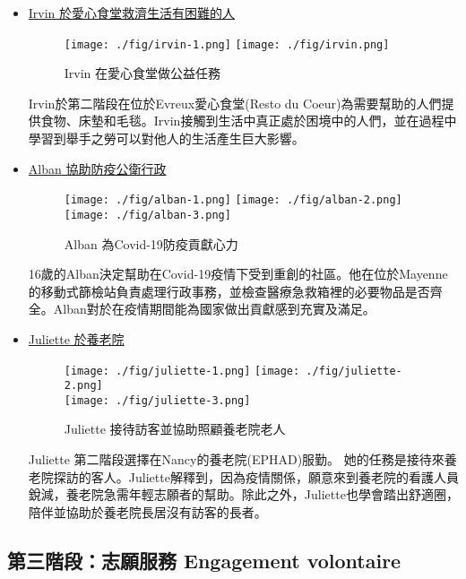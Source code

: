 \documentclass[a4paper,14pt]{extarticle}
\theoremstyle{plain}
\theoremstyle{remark}
\numberwithin{equation}{section}
\begin{document}
\begin{itemize}
  \item \href{https://www.youtube.com/watch?v=ABboKKTpFp4}{Irvin 於愛心食堂救濟生活有困難的人}
\begin{figure}[H]
    \centering
    \texttt{[image: ./fig/irvin-1.png]}
    \texttt{[image: ./fig/irvin.png]}
    \caption{Irvin 在愛心食堂做公益任務}
\end{figure}
Irvin於第二階段在位於Evreux愛心食堂(Resto du Coeur)為需要幫助的人們提供食物、床墊和毛毯。Irvin接觸到生活中真正處於困境中的人們，並在過程中學習到舉手之勞可以對他人的生活產生巨大影響。
\item \href{https://www.youtube.com/watch?v=3mOpBhQCeV4}{Alban 協助防疫公衛行政}
\begin{figure}[H]
    \centering
    \texttt{[image: ./fig/alban-1.png]}
    \texttt{[image: ./fig/alban-2.png]}
    \texttt{[image: ./fig/alban-3.png]}
    \caption{Alban 為Covid-19防疫貢獻心力}
    \label{fig:alban_snu}
\end{figure}
    16歲的Alban決定幫助在Covid-19疫情下受到重創的社區。他在位於Mayenne的移動式篩檢站負責處理行政事務，並檢查醫療急救箱裡的必要物品是否齊全。Alban對於在疫情期間能為國家做出貢獻感到充實及滿足。
  \item \href{https://www.youtube.com/watch?v=GJaVtazMRgI}{Juliette 於養老院}

\begin{figure}[H]
    \centering
    \texttt{[image: ./fig/juliette-1.png]}
    \texttt{[image: ./fig/juliette-2.png]}
    \\ \vspace{0.1cm}
    \texttt{[image: ./fig/juliette-3.png]}
    \caption{Juliette 接待訪客並協助照顧養老院老人}
    \label{fig:juliette_snu}
\end{figure}

    Juliette 第二階段選擇在Nancy的養老院(EPHAD)服勤。
她的任務是接待來養老院探訪的客人。Juliette解釋到，因為疫情關係，願意來到養老院的看護人員銳減，養老院急需年輕志願者的幫助。除此之外，Juliette也學會踏出舒適圈，陪伴並協助於養老院長居沒有訪客的長者。

\end{itemize}




\subsection{第三階段：志願服務 Engagement volontaire}
\end{document}
